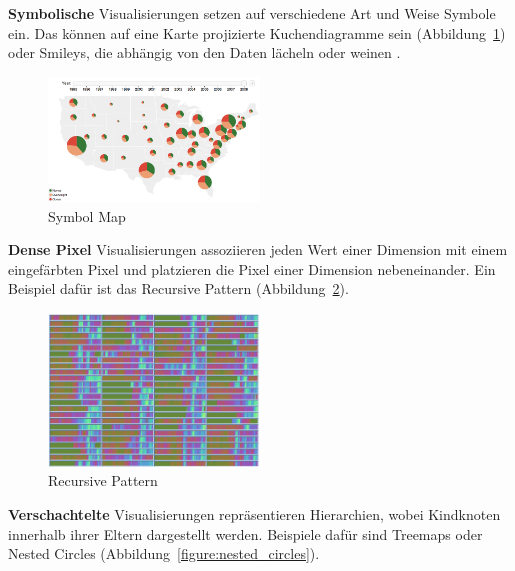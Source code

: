 \documentclass[
	headsepline,
	footsepline,
	fontsize=12pt,
	bibliography=totoc
]{scrbook}
\begin{document}

\textbf{Symbolische} Visualisierungen setzen auf verschiedene Art und Weise Symbole ein. Das können auf eine Karte projizierte Kuchendiagramme sein (Abbildung~\ref{figure:symbol_map}) oder Smileys, die abhängig von den Daten lächeln oder weinen \cite{Chernoff1973}.

\begin{figure}[htbp]
   \centering
   \includegraphics[width=0.5\textwidth]{images/grundlagen-symbol_map.png}
   \caption{Symbol Map}
   \label{figure:symbol_map}
\end{figure}


\textbf{Dense Pixel} Visualisierungen assoziieren jeden Wert einer Dimension mit einem eingefärbten Pixel und platzieren die Pixel einer Dimension nebeneinander. Ein Beispiel dafür ist das Recursive Pattern \cite{Keim1995} (Abbildung~\ref{figure:recursive_pattern}).

\begin{figure}[htbp]
   \centering
   \includegraphics[width=0.5\textwidth]{images/grundlagen-recursive_pattern.png}
   \caption{Recursive Pattern}
   \label{figure:recursive_pattern}
\end{figure}


\textbf{Verschachtelte} Visualisierungen repräsentieren Hierarchien, wobei Kindknoten innerhalb ihrer Eltern dargestellt werden. Beispiele dafür sind Treemaps \cite{Shneiderman1992} oder Nested Circles (Abbildung~\ref{figure:nested_circles}).
\end{document}
